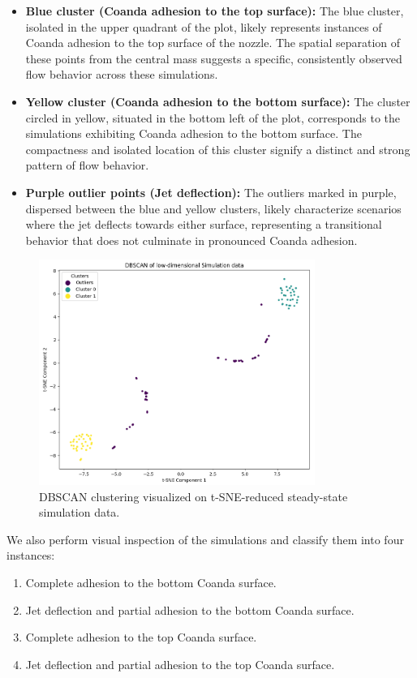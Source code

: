 \begin{itemize}
  \item \textbf{Blue cluster (Coanda adhesion to the top surface):} The blue cluster, isolated in the upper quadrant of the plot, likely represents instances of Coanda adhesion to the top surface of the nozzle. The spatial separation of these points from the central mass suggests a specific, consistently observed flow behavior across these simulations.
  \item \textbf{Yellow cluster (Coanda adhesion to the bottom surface):} The cluster circled in yellow, situated in the bottom left of the plot, corresponds to the simulations exhibiting Coanda adhesion to the bottom surface. The compactness and isolated location of this cluster signify a distinct and strong pattern of flow behavior.
  \item \textbf{Purple outlier points (Jet deflection):} The outliers marked in purple, dispersed between the blue and yellow clusters, likely characterize scenarios where the jet deflects towards either surface, representing a transitional behavior that does not culminate in pronounced Coanda adhesion.
\end{itemize}
\begin{figure}[ht]
    \centering
    \includegraphics[width=9cm]{images/Clustering/dbscan_tsne_sim.png}
    \caption{DBSCAN clustering visualized on t-SNE-reduced steady-state simulation data.}
    \label{dbscan_tsne}
\end{figure}
We also perform visual inspection of the simulations and classify them into four instances:  
\begin{enumerate}
    \item Complete adhesion to the bottom Coanda surface. 
    \item Jet deflection and partial adhesion to the bottom Coanda surface. 
    \item Complete adhesion to the top Coanda surface. 
    \item Jet deflection and partial adhesion to the top Coanda surface. 
\end{enumerate}
